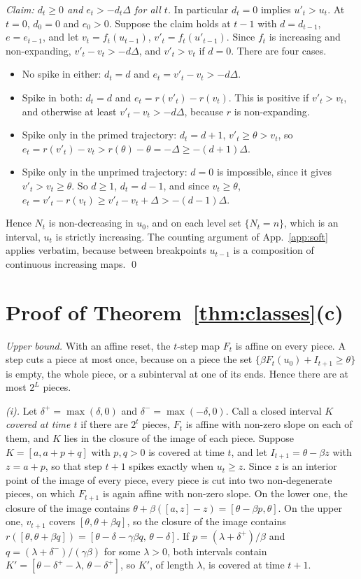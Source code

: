 \documentclass[10pt]{article}
\theoremstyle{remark}
\begin{document}
\emph{Claim: $d_t\ge0$ and $e_t>-d_t\Delta$ for all $t$.} In particular $d_t=0$ implies $u'_t>u_t$. At $t=0$, $d_0=0$ and $e_0>0$. Suppose the claim holds at $t-1$ with $d=d_{t-1}$, $e=e_{t-1}$, and let $v_t=f_t(u_{t-1})$, $v'_t=f_t(u'_{t-1})$. Since $f_t$ is increasing and non-expanding, $v'_t-v_t>-d\Delta$, and $v'_t>v_t$ if $d=0$. There are four cases.
\begin{itemize}[leftmargin=*]
\item No spike in either: $d_t=d$ and $e_t=v'_t-v_t>-d\Delta$.
\item Spike in both: $d_t=d$ and $e_t=r(v'_t)-r(v_t)$. This is positive if $v'_t>v_t$, and otherwise at least $v'_t-v_t>-d\Delta$, because $r$ is non-expanding.
\item Spike only in the primed trajectory: $d_t=d+1$, $v'_t\ge\theta>v_t$, so $e_t=r(v'_t)-v_t>r(\theta)-\theta=-\Delta\ge-(d+1)\Delta$.
\item Spike only in the unprimed trajectory: $d=0$ is impossible, since it gives $v'_t>v_t\ge\theta$. So $d\ge1$, $d_t=d-1$, and since $v_t\ge\theta$, $e_t=v'_t-r(v_t)\ge v'_t-v_t+\Delta>-(d-1)\Delta$.
\end{itemize}
Hence $N_t$ is non-decreasing in $u_0$, and on each level set $\{N_t=n\}$, which is an interval, $u_t$ is strictly increasing. The counting argument of App.~\ref{app:soft} applies verbatim, because between breakpoints $u_{t-1}$ is a composition of continuous increasing maps. \qed

\section{Proof of Theorem~\ref{thm:classes}(c)}
\label{app:lower}

\emph{Upper bound.} With an affine reset, the $t$-step map $F_t$ is affine on every piece. A step cuts a piece at most once, because on a piece the set $\{\beta F_t(u_0)+I_{t+1}\ge\theta\}$ is empty, the whole piece, or a subinterval at one of its ends. Hence there are at most $2^L$ pieces.

\emph{(i).} Let $\delta^+=\max(\delta,0)$ and $\delta^-=\max(-\delta,0)$. Call a closed interval $K$ \emph{covered at time $t$} if there are $2^t$ pieces, $F_t$ is affine with non-zero slope on each of them, and $K$ lies in the closure of the image of each piece. Suppose $K=[a,a+p+q]$ with $p,q>0$ is covered at time $t$, and let $I_{t+1}=\theta-\beta z$ with $z=a+p$, so that step $t+1$ spikes exactly when $u_t\ge z$. Since $z$ is an interior point of the image of every piece, every piece is cut into two non-degenerate pieces, on which $F_{t+1}$ is again affine with non-zero slope. On the lower one, the closure of the image contains $\theta+\beta([a,z]-z)=[\theta-\beta p,\theta]$. On the upper one, $v_{t+1}$ covers $[\theta,\theta+\beta q]$, so the closure of the image contains $r([\theta,\theta+\beta q])=[\theta-\delta-\gamma\beta q,\,\theta-\delta]$. If $p=(\lambda+\delta^+)/\beta$ and $q=(\lambda+\delta^-)/(\gamma\beta)$ for some $\lambda>0$, both intervals contain $K'=[\theta-\delta^+-\lambda,\,\theta-\delta^+]$, so $K'$, of length $\lambda$, is covered at time $t+1$.
\end{document}
